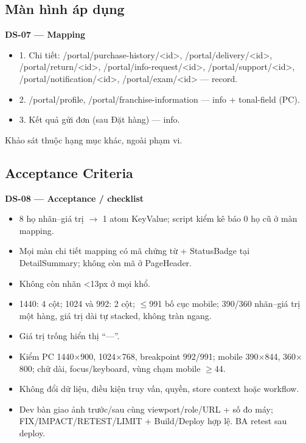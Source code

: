 \documentclass[11pt,a4paper]{report}
\begin{document}
\subsection*{Màn hình áp dụng}
\par\smallskip\textbf{DS-07 — Mapping}\par
\begin{itemize}[label={}]
\item 1. Chi tiết: /portal/\allowbreak{}purchase-\allowbreak{}history/\allowbreak{}\textless{}id\textgreater{}, /portal/\allowbreak{}delivery/\allowbreak{}\textless{}id\textgreater{}, /portal/\allowbreak{}return/\allowbreak{}\textless{}id\textgreater{}, /portal/\allowbreak{}info-\allowbreak{}request/\allowbreak{}\textless{}id\textgreater{}, /portal/\allowbreak{}support/\allowbreak{}\textless{}id\textgreater{}, /portal/\allowbreak{}notification/\allowbreak{}\textless{}id\textgreater{}, /portal/\allowbreak{}exam/\allowbreak{}\textless{}id\textgreater{} — record.
\item 2. /portal/\allowbreak{}profile, /portal/\allowbreak{}franchise-\allowbreak{}information — info + tonal-\allowbreak{}field (PC).
\item 3. Kết quả gửi đơn (sau Đặt hàng) — info.
\end{itemize}
Khảo sát thuộc hạng mục khác, ngoài phạm vi.\par
\subsection*{Acceptance Criteria}
\par\smallskip\textbf{DS-08 — Acceptance / checklist}\par
\begin{itemize}[label=$\square$]
\item 8 họ nhãn–giá trị \(\to\) 1 atom KeyValue; script kiểm kê báo 0 họ cũ ở màn mapping.
\item Mọi màn chi tiết mapping có mã chứng từ + StatusBadge tại DetailSummary; không còn mã ở PageHeader.
\item Không còn nhãn \textless{}13px ở mọi khổ.
\item 1440: 4 cột; 1024 và 992: 2 cột; \(\leq\)991 bố cục mobile; 390/\allowbreak{}360 nhãn–giá trị một hàng, giá trị dài tự stacked, không tràn ngang.
\item Giá trị trống hiển thị “—”.
\item Kiểm PC 1440\(\times\)900, 1024\(\times\)768, breakpoint 992/\allowbreak{}991; mobile 390\(\times\)844, 360\(\times\)800; chữ dài, focus/\allowbreak{}keyboard, vùng chạm mobile \(\geq\)44.
\item Không đổi dữ liệu, điều kiện truy vấn, quyền, store context hoặc workflow.
\item Dev bàn giao ảnh trước/\allowbreak{}sau cùng viewport/\allowbreak{}role/\allowbreak{}URL + số đo máy; FIX/\allowbreak{}IMPACT/\allowbreak{}RETEST/\allowbreak{}LIMIT + Build/\allowbreak{}Deploy hợp lệ. BA retest sau deploy.
\end{itemize}
\end{document}
